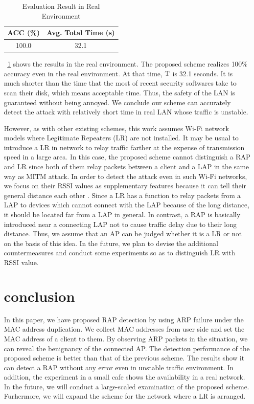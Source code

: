 \documentclass[conference]{IEEEtran}
\begin{document}
\begin{table}[t] 
    \begin{center}
        \caption{Evaluation Result in Real Environment}
        \label{tab:real}
        \begin{tabular}{c c} \hline
            ACC (\%) & Avg. Total Time (s) \\ \hline \hline
            100.0 & 32.1 \\ \hline
        \end{tabular}
    \end{center}
    \vspace{-2zh}
\end{table}

\tablename~\ref{tab:real} shows the results in the real environment.
The proposed scheme realizes 100\% accuracy even in the real environment.
At that time, $\rm T$ is 32.1 seconds.
It is much shorter than the time that the most of recent security softwares take to scan their disk, which means acceptable time.
Thus, the safety of the LAN is guaranteed without being annoyed.
We conclude our scheme can accurately detect the attack with relatively short time in real LAN whose traffic is unstable.

However, as with other existing schemes, this work assumes Wi-Fi network models where Legitimate Repeaters (LR) are not installed.
It may be usual to introduce a LR in network to relay traffic farther at the expense of transmission speed in a large area.
In this case, the proposed scheme cannot distinguish a RAP and LR since both of them relay packets between a client and a LAP in the same way as MITM attack.
In order to detect the attack even in such Wi-Fi networks, we focus on their RSSI values as supplementary features because it can tell their general distance each other \cite{rssi}.
Since a LR has a function to relay packets from a LAP to devices which cannot connect with the LAP because of the long distance, it should be located far from a LAP in general.
In contrast, a RAP is basically introduced near a connecting LAP not to cause traffic delay due to their long distance.
Thus, we assume that an AP can be judged whether it is a LR or not on the basis of this idea.
In the future, we plan to devise the additional countermeasures and conduct some experiments so as to distinguish LR with RSSI value.

\section{conclusion}\label{sec:6}
In this paper, we have proposed RAP detection by using ARP failure under the MAC address duplication.
We collect MAC addresses from user side and set the MAC address of a client to them.
By observing ARP packets in the situation, we can reveal the benignancy of the connected AP.
The detection performance of the proposed scheme is better than that of the previous scheme.
The results show it can detect a RAP without any error even in unstable traffic environment.
In addition, the experiment in a small cafe shows the availability in a real network.
In the future, we will conduct a large-scaled examination of the proposed scheme.
Furhermore, we will expand the scheme for the network where a LR is arranged.
\end{document}
